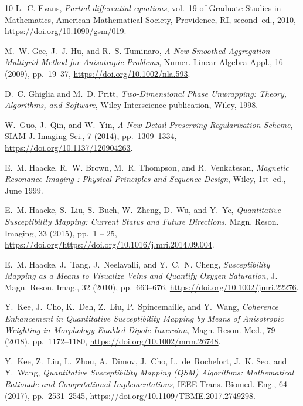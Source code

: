 \documentclass[reqno]{siamonline1116}
\numberwithin{theorem}{section}
\numberwithin{equation}{section}
\begin{document}
\begin{thebibliography}{10}
{\sc L.~C. Evans}, {\em Partial differential equations}, vol.~19 of Graduate
  Studies in Mathematics, American Mathematical Society, Providence, RI,
  second~ed., 2010, \url{https://doi.org/10.1090/gsm/019}.

{\sc M.~W. Gee, J.~J. Hu, and R.~S. Tuminaro}, {\em {A New Smoothed Aggregation
  Multigrid Method for Anisotropic Problems}}, Numer. Linear Algebra Appl., 16
  (2009), pp.~19--37, \url{https://doi.org/10.1002/nla.593}.

{\sc D.~C. Ghiglia and M.~D. Pritt}, {\em Two-Dimensional Phase Unwrapping:
  Theory, Algorithms, and Software}, Wiley-Interscience publication, Wiley,
  1998.

{\sc W.~Guo, J.~Qin, and W.~Yin}, {\em {A New Detail-Preserving Regularization
  Scheme}}, SIAM J. Imaging Sci., 7 (2014), pp.~1309--1334,
  \url{https://doi.org/10.1137/120904263}.

{\sc E.~M. Haacke, R.~W. Brown, M.~R. Thompson, and R.~Venkatesan}, {\em
  {Magnetic Resonance Imaging : Physical Principles and Sequence Design}},
  Wiley, 1st~ed., June 1999.

{\sc E.~M. Haacke, S.~Liu, S.~Buch, W.~Zheng, D.~Wu, and Y.~Ye}, {\em
  {Quantitative Susceptibility Mapping: Current Status and Future Directions}},
  Magn. Reson. Imaging, 33 (2015), pp.~1 -- 25,
  \url{https://doi.org/https://doi.org/10.1016/j.mri.2014.09.004}.

{\sc E.~M. Haacke, J.~Tang, J.~Neelavalli, and Y.~C.~N. Cheng}, {\em
  {Susceptibility Mapping as a Means to Visualize Veins and Quantify Oxygen
  Saturation}}, J. Magn. Reson. Imag., 32 (2010), pp.~663--676,
  \url{https://doi.org/10.1002/jmri.22276}.

{\sc Y.~Kee, J.~Cho, K.~Deh, Z.~Liu, P.~Spincemaille, and Y.~Wang}, {\em
  {Coherence Enhancement in Quantitative Susceptibility Mapping by Means of
  Anisotropic Weighting in Morphology Enabled Dipole Inversion}}, Magn. Reson.
  Med., 79 (2018), pp.~1172--1180, \url{https://doi.org/10.1002/mrm.26748}.

{\sc Y.~Kee, Z.~Liu, L.~Zhou, A.~Dimov, J.~Cho, L.~de~Rochefort, J.~K. Seo, and
  Y.~Wang}, {\em {Quantitative Susceptibility Mapping (QSM) Algorithms:
  Mathematical Rationale and Computational Implementations}}, IEEE Trans.
  Biomed. Eng., 64 (2017), pp.~2531--2545,
  \url{https://doi.org/10.1109/TBME.2017.2749298}.


\end{thebibliography}
\end{document}
